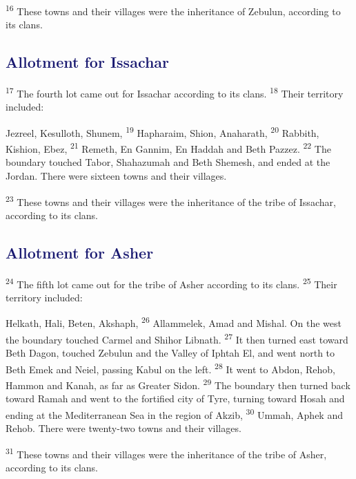 \documentclass[12pt,twoside]{article}
\newcommand{\vs}[1]{\textsuperscript{#1}}
\begin{document}
\noindent \vs{16} These towns and their villages were the inheritance of Zebulun, according to its clans.

\subsection*{\textcolor{MidnightBlue}{\textbf{Allotment for Issachar}}}

\vs{17} The fourth lot came out for Issachar according to its clans.
\vs{18} Their territory included:

\begin{adjustwidth}{0.5cm}{0cm}
  \hspace{0.5cm}Jezreel, Kesulloth, Shunem,
  \vs{19} Hapharaim, Shion, Anaharath,
  \vs{20} Rabbith, Kishion, Ebez,
  \vs{21} Remeth, En Gannim, En Haddah and Beth Pazzez.
  \vs{22} The boundary touched Tabor, Shahazumah and Beth Shemesh, and ended at the Jordan. There were sixteen towns and their villages.
\end{adjustwidth}

\noindent \vs{23} These towns and their villages were the inheritance of the tribe of Issachar, according to its clans.

\subsection*{\textcolor{MidnightBlue}{\textbf{Allotment for Asher}}}
\vs{24} The fifth lot came out for the tribe of Asher according to its clans.
\vs{25} Their territory included:

\begin{adjustwidth}{0.5cm}{0cm}
  \hspace{0.5cm}Helkath, Hali, Beten, Akshaph,
  \vs{26} Allammelek, Amad and Mishal. On the west the boundary touched Carmel and Shihor Libnath.
  \vs{27} It then turned east toward Beth Dagon, touched Zebulun and the Valley of Iphtah El, and went north to Beth Emek and Neiel, passing Kabul on the left.
  \vs{28} It went to Abdon, Rehob, Hammon and Kanah, as far as Greater Sidon.
  \vs{29} The boundary then turned back toward Ramah and went to the fortified city of Tyre, turning toward Hosah and ending at the Mediterranean Sea in the region of Akzib,
  \vs{30} Ummah, Aphek and Rehob. There were twenty-two towns and their villages.
\end{adjustwidth}

\noindent \vs{31} These towns and their villages were the inheritance of the tribe of Asher, according to its clans.
\end{document}
